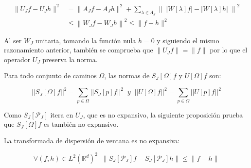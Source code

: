 \begin{align*} 
    \|U_J f-U_J h\|^2 &= \|A_J f-A_J h\|^2+\sum_{\lambda\in\Lambda_J} \left\| \; |W[\lambda]f|-|W[\lambda]h| \; \right\|^2 \\
    &\leq \left\| W_J f- W_J h \right\|^2 \leq \|f-h\|^2
\end{align*}

\noindent Al ser $W_J$ unitaria, tomando la función nula $h=0$ y siguiendo el mismo razonamiento anterior, también se comprueba que $\|U_J f\|=\|f\|$ por lo que el operador $U_J$ preserva la norma.

\medskip

\noindent Para todo conjunto de caminos $\Omega$, las normas de $S_J[\Omega]f$ y $U[\Omega]f$ son: 

$$\left|\left| S_J[\Omega]f \right|\right|^2=\sum_{p\in\Omega} \left|\left| S_J[p]f\right|\right|^2 \;\; y \;\; \left|\left|U[\Omega]f\right|\right|^2=\sum_{p\in\Omega} \left|\left| U[p]f\right|\right|^2$$

\noindent Como $S_J[\mathcal{P}_J]$ itera en $U_J$, que es no expansivo, la siguiente proposición prueba que $S_J[\Omega]f$ es también no expansivo. 

\begin{proposicion} \label{proposicion::NoExpansiva}
La transformada de dispersión de ventana es no expansiva: 

\begin{equation}
  \forall (f,h)\in L^2(\mathbb{R}^d)^2 \;\; \|S_J[\mathcal{P}_J]f-S_J[\mathcal{P}_J]h\| \leq \|f-h\|
\end{equation}
\end{proposicion}

